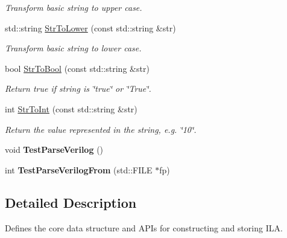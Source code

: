 \begin{DoxyCompactItemize}
\begin{DoxyCompactList}\small\item\em Transform basic string to upper case. \end{DoxyCompactList}\item 
\mbox{\label{namespaceilang_a44cdb1960acea845bdad15ad077fb1e7}} 
std\+::string \mbox{\hyperlink{namespaceilang_a44cdb1960acea845bdad15ad077fb1e7}{Str\+To\+Lower}} (const std\+::string \&str)
\begin{DoxyCompactList}\small\item\em Transform basic string to lower case. \end{DoxyCompactList}\item 
\mbox{\label{namespaceilang_a10cf3586b9c4507e7a8ba88bb181b158}} 
bool \mbox{\hyperlink{namespaceilang_a10cf3586b9c4507e7a8ba88bb181b158}{Str\+To\+Bool}} (const std\+::string \&str)
\begin{DoxyCompactList}\small\item\em Return true if string is \char`\"{}true\char`\"{} or \char`\"{}\+True\char`\"{}. \end{DoxyCompactList}\item 
\mbox{\label{namespaceilang_a6be0ce405f6e9487afc441d2d2200b00}} 
int \mbox{\hyperlink{namespaceilang_a6be0ce405f6e9487afc441d2d2200b00}{Str\+To\+Int}} (const std\+::string \&str)
\begin{DoxyCompactList}\small\item\em Return the value represented in the string, e.\+g. \char`\"{}10\char`\"{}. \end{DoxyCompactList}\item 
\mbox{\label{namespaceilang_a01f8e2034f6578c089d6ceb5600cab7d}} 
void {\bfseries Test\+Parse\+Verilog} ()
\item 
\mbox{\label{namespaceilang_a80bc7ea62eac3a9dd0dfcc0337abe99d}} 
int {\bfseries Test\+Parse\+Verilog\+From} (std\+::\+F\+I\+LE $\ast$fp)
\end{DoxyCompactItemize}


\subsection{Detailed Description}
Defines the core data structure and A\+P\+Is for constructing and storing I\+LA. 

